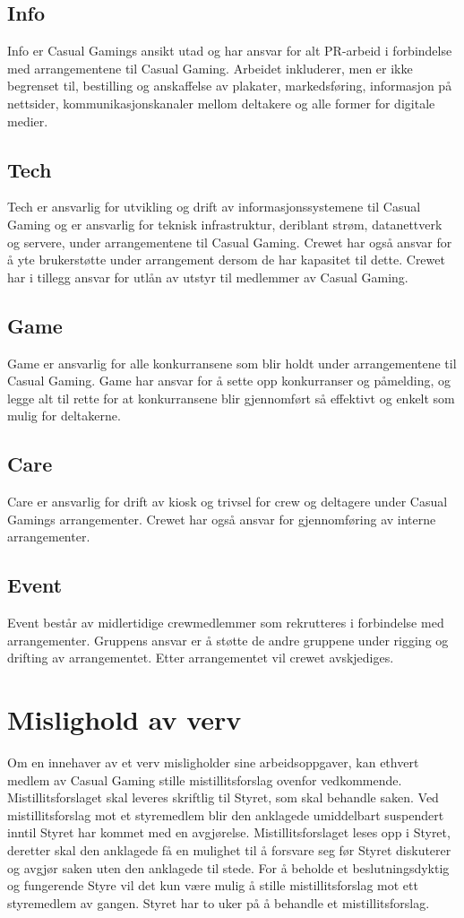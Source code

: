 \subsection{Info}
Info er Casual Gamings ansikt utad og har ansvar for alt PR-arbeid i forbindelse med arrangementene til Casual Gaming. Arbeidet inkluderer, men er ikke begrenset til, bestilling og anskaffelse av plakater, markedsføring, informasjon på nettsider, kommunikasjonskanaler mellom deltakere og alle former for digitale medier.

\subsection{Tech}
Tech er ansvarlig for utvikling og drift av informasjonssystemene til Casual Gaming og er ansvarlig for teknisk infrastruktur, deriblant strøm, datanettverk og servere, under arrangementene til Casual Gaming. Crewet har også ansvar for å yte brukerstøtte under arrangement dersom de har kapasitet til dette. Crewet har i tillegg ansvar for utlån av utstyr til medlemmer av Casual Gaming.

\subsection{Game}
Game er ansvarlig for alle konkurransene som blir holdt under arrangementene til Casual Gaming. Game har ansvar for å sette opp konkurranser og påmelding, og legge alt til rette for at konkurransene blir gjennomført så effektivt og enkelt som mulig for deltakerne.

\subsection{Care}
Care er ansvarlig for drift av kiosk og trivsel for crew og deltagere under Casual Gamings arrangementer. Crewet har også ansvar for gjennomføring av interne arrangementer.

\subsection{Event}
Event består av midlertidige crewmedlemmer som rekrutteres i forbindelse med arrangementer. Gruppens ansvar er å støtte de andre gruppene under rigging og drifting av arrangementet. Etter arrangementet vil crewet avskjediges.

\section{Mislighold av verv}
Om en innehaver av et verv misligholder sine arbeidsoppgaver, kan ethvert medlem av Casual Gaming stille mistillitsforslag ovenfor vedkommende. Mistillitsforslaget skal leveres skriftlig til Styret, som skal behandle saken. Ved mistillitsforslag mot et styremedlem blir den anklagede umiddelbart suspendert inntil Styret har kommet med en avgjørelse. Mistillitsforslaget leses opp i Styret, deretter skal den anklagede få en mulighet til å forsvare seg før Styret diskuterer og avgjør saken uten den anklagede til stede. For å beholde et beslutningsdyktig og fungerende Styre vil det kun være mulig å stille mistillitsforslag mot ett styremedlem av gangen. Styret har to uker på å behandle et mistillitsforslag.
